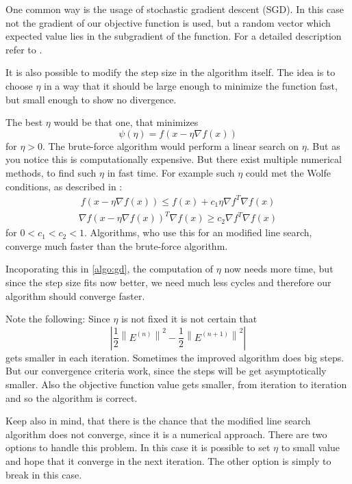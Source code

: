 \documentclass[DIV=14,twocolumn]{scrartcl}
\newcommand{\norm}[1]{\left\lVert#1\right\rVert}
\begin{document}
One common way is the usage of stochastic gradient descent (SGD). In this case not the gradient of our objective function is used, but a random vector which expected value lies in the subgradient of the function. For a detailed description refer to \cite{ShSh14}.

It is also possible to modify the step size in the algorithm itself. The idea is to choose $\eta$ in a way that it should be large enough to minimize the function fast, but small enough to show no divergence. 

The best $\eta$ would be that one, that minimizes $$\psi(\eta) = f(x-\eta\nabla f(x))$$ for $\eta > 0$. The brute-force algorithm would perform a linear search on $\eta$. But as you notice this is computationally expensive.  But there exist multiple numerical methods, to find such $\eta$ in fast time. For example such $\eta$ could met the Wolfe conditions, as described in \cite{NoWr06}:
\begin{equation*}
\begin{split}
f(x-\eta\nabla f(x)) \leq f(x) + c_1\eta\nabla f^T\nabla f(x)
\end{split}
\end{equation*}
\begin{equation*}
\begin{split}
\nabla f(x-\eta\nabla f(x))^T\nabla f(x) \geq c_2\nabla f^T\nabla f(x)
\end{split}
\end{equation*}
for $0 < c_1 < c_2 < 1$.
Algorithms, who use this for an modified line search, converge much faster than the brute-force algorithm.

Incoporating this in \autoref{algo:gd}, the computation of $\eta$ now needs more time, but since the step size fits now better, we need much less cycles and therefore our algorithm should converge faster. 

Note the following: Since $\eta$ is not fixed it is not certain that $$|\frac{1}{2}\norm{E^{(n)}}^2-\frac{1}{2}\norm{E^{(n+1)}}^2|$$ gets smaller in each iteration. Sometimes the improved algorithm does big steps. But our convergence criteria work, since the steps will be get asymptotically smaller. Also the objective function value gets smaller, from iteration to iteration and so the algorithm is correct. 

Keep also in mind, that there is the chance that the modified line search algorithm does not converge, since it is a numerical approach. There are two options to handle this problem. In this case it is possible to set $\eta$ to small value and hope that it converge in the next iteration. The other option is simply to break in this case.
\end{document}
